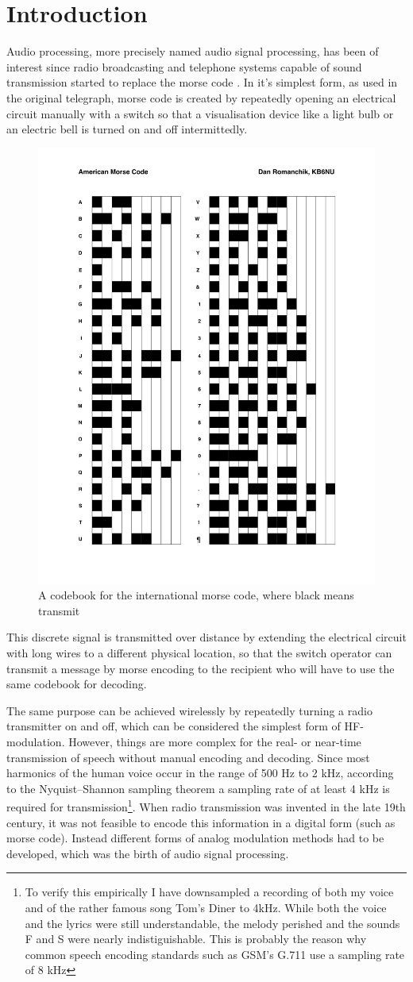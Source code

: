 \chapter{Introduction}
\label{Introduction}

Audio processing, more precisely named audio signal processing, has been of interest since radio broadcasting and telephone systems capable of sound transmission started to replace the morse code \cite{spanias2006audio}. In it's simplest form, as used in the original telegraph, morse code is created by repeatedly opening an electrical circuit manually with a switch so that a visualisation device like a light bulb or an electric bell is turned on and off intermittedly. 


\begin{figure}[H]
    \centering
	\includegraphics[width=.45\textwidth]{./images/illustrations/morse-chart}
    \caption{A codebook for the international morse code, where black means transmit}
    \label{fig:morse}
\end{figure}

This discrete signal is transmitted over distance by extending the electrical circuit with long wires to a different physical location, so that the switch operator can transmit a message by morse encoding to the recipient who will have to use the same codebook for decoding.

The same purpose can be achieved wirelessly by repeatedly turning a radio transmitter on and off, which can be considered the simplest form of HF-modulation. However, things are more complex for the real- or near-time transmission of speech without manual encoding and decoding. Since most harmonics of the human voice occur in the range of 500 Hz to 2 kHz, according to the Nyquist–Shannon sampling theorem a sampling rate of at least 4 kHz is required for transmission\footnote{To verify this empirically I have downsampled a recording of both my voice and of the rather famous song Tom's Diner to 4kHz. While both the voice and the lyrics were still understandable, the melody perished and the sounds F and S were nearly indistiguishable. This is probably the reason why common speech encoding standards such as GSM's G.711 use a sampling rate of 8 kHz}. When radio transmission was invented in the late 19th century, it was not feasible to encode this information in a digital form (such as morse code). Instead different forms of analog modulation methods had to be developed, which was the birth of audio signal processing.

